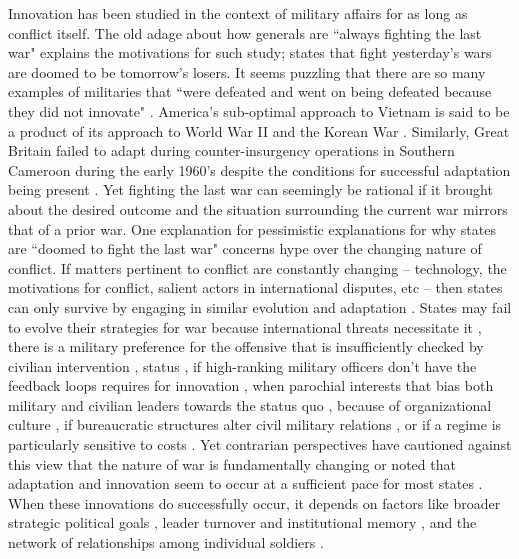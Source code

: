 \documentclass[12pt,letterpaper]{article}
\begin{document}
	Innovation has been studied in the context of military affairs for as long as conflict itself. The old adage about how generals are ``always fighting the last war" explains the motivations for such study; states that fight yesterday's wars are doomed to be tomorrow's losers. It seems puzzling that there are so many examples of militaries that ``were defeated and went on being defeated because they did not innovate" \citet[9]{rosen_winningnextwar_1991}. America's sub-optimal approach to Vietnam is said to be a product of its approach to World War II and the Korean War \citep{krepinevich_armyvietnam_1986, sorley_betterwarunexamined_1999, nagl_learningeatsoup_2005}. Similarly, Great Britain failed to adapt during counter-insurgency operations in Southern Cameroon during the early 1960's despite the conditions for successful adaptation being present \citep{harkness_militarymaladaptationcounterinsurgency_2015}. Yet fighting the last war can seemingly be rational if it brought about the desired outcome and the situation surrounding the current war mirrors that of a prior war. One explanation for pessimistic explanations for why states are ``doomed to fight the last war" concerns hype over the changing nature of conflict. If matters pertinent to conflict are constantly changing -- technology, the motivations for conflict, salient actors in international disputes, etc -- then states can only survive by engaging in similar evolution and adaptation \citep{rosen_winningnextwar_1991}. States may fail to evolve their strategies for war because international threats necessitate it \citep{layton_wastherepearl_1985, fairbanks_choosingtechnologiesanglogerman_1988}, there is a military preference for the offensive that is insufficiently checked by civilian intervention \citep{posen_sourcemilitarydoctrine_1984, snyder_ideologyoffensivemilitary_1989}, status \citep{katzenbach_horsecavalrytwentieth_1971}, if high-ranking military officers don't have the feedback loops requires for innovation \citep{rosen_winningnextwar_1991, foley_dumbdonkeyscunning_2014}, when parochial interests that bias both military and civilian leaders towards the status quo \citep{zisk_engagingenemyorganization_1993}, because of organizational culture \citep{kier_imaginingwarfrench_1997, nagl_learningeatsoup_2005, raths_germantankproduction_2011}, if bureaucratic structures alter civil military relations \citep{avant_politicalinstitutionsmilitary_1994}, or if a regime is particularly sensitive to costs \citep{rosen_vietnamamericantheory_1982, caverley_mythmilitarymyopia_2009}. Yet contrarian perspectives have cautioned against this view that the nature of war is fundamentally changing \citep{gentile_forumprogressdissent_2009, porch_counterinsurgencyexposingmyths_2013} or noted that adaptation and innovation seem to occur at a sufficient pace for most states \citep{terraine_douglashaigeducated_1963, murray_militaryinnovationinterwar_1996}. When these innovations do successfully occur, it depends on factors like broader strategic political goals \citep{harkness_militarymaladaptationcounterinsurgency_2015}, leader turnover and institutional memory \citep{farrell_improvingwarmilitary_2010}, and the network of relationships among individual soldiers \citep{kollars_warhorizonsoldierled_2015}.
\end{document}
